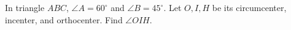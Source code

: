 In triangle $ABC$, $\angle A=60^\circ$ and $\angle B=45^\circ$. Let $O,I,H$ be its circumcenter, incenter, and orthocenter. Find $\angle OIH$.
